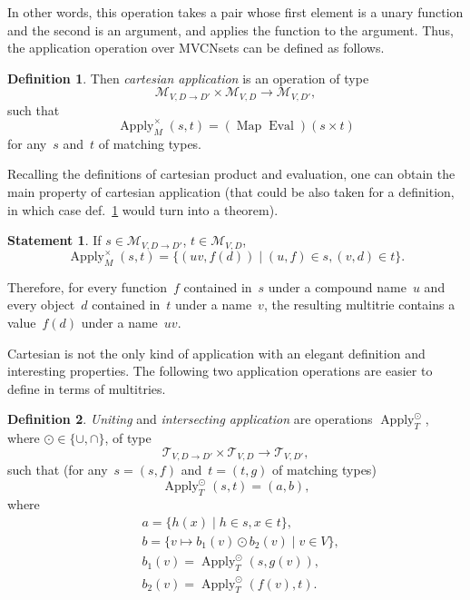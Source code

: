 \documentclass{article}
\theoremstyle{definition}
\newtheorem{Df}{Definition}
\newtheorem{St}{Statement}
\newcommand{\setcharmvcn}{M}
\newcommand{\setcharmt}{T}
\newcommand{\setsymbol}[3]{\mathcal{#1}_{#2,#3}}
\newcommand{\setmvcn}[2]{\setsymbol{\setcharmvcn}{#1}{#2}}
\newcommand{\setmt}[2]{\setsymbol{\setcharmt}{#1}{#2}}
\newcommand{\fmap}{\operatorname{Map}}
\newcommand{\apply}{\operatorname{Apply}}
\newcommand{\eval}{\operatorname{Eval}}
\begin{document}
In other words, this operation takes a pair whose first element is a unary
function and the second is an argument, and applies the function to the
argument. Thus, the application operation over MVCNsets can be defined as
follows.

\begin{Df}\label{df:mvcn-apply-cartesian}
Then \emph{cartesian application} is an operation of type
\[
\setmvcn{V}{D\to D'} \times \setmvcn{V}{D} \to \setmvcn{V}{D'} ,
\]
such that
\[
  \apply_{\setcharmvcn}^{\times} (s, t) = (\fmap \eval) (s \times t)
\]
for any~$s$ and~$t$ of matching types.
\end{Df}

Recalling the definitions of cartesian product and evaluation, one can
obtain the main property of cartesian application (that could be also taken
for a definition, in which case def.~\ref{df:mvcn-apply-cartesian} would turn
into a theorem).
 
\begin{St}\label{st:mvcn-apply-cartesian}
If $s\in \setmvcn{V}{D\to D'}$, $t\in \setmvcn{V}{D}$,
\[
  \apply_{\setcharmvcn}^{\times} (s, t) =
    \{ (uv, f(d)) \mid (u,f) \in s, (v,d) \in t \} .
\]
\end{St}

Therefore, for every function~$f$ contained in~$s$ under a compound name~$u$
and every object~$d$ contained in~$t$ under a name~$v$, the resulting
multitrie contains a value~$f(d)$ under a name~$uv$.

Cartesian is not the only kind of application with an elegant definition and
interesting properties.  The following two application operations are
easier to define in terms of multitries.

\begin{Df}\label{df:mt-apply-setop}
\emph{Uniting} and \emph{intersecting application} are operations
$\apply_{\setcharmt}^{\odot}$, where $\odot \in \{\cup, \cap \}$, of type
\[
  \setmt{V}{D\to D'} \times \setmt{V}{D} \to \setmt{V}{D'},
\]
such that (for any~$s = (s, f)$ and~$t = (t, g)$ of matching types)
\[
  \apply_{\setcharmt}^{\odot} (s, t) = (a, b) ,
\]
where
\begin{eqnarray*}
  & a      = \{ h(x) \mid h \in s, x \in t \} , \\
  & b      = \{ v \mapsto b_1(v) \odot b_2(v) \mid v \in V \}, \\
  & b_1(v) = \apply_{\setcharmt}^{\odot}(s, g(v)), \\
  & b_2(v) = \apply_{\setcharmt}^{\odot}(f(v), t) .
\end{eqnarray*}
\end{Df}
\end{document}
